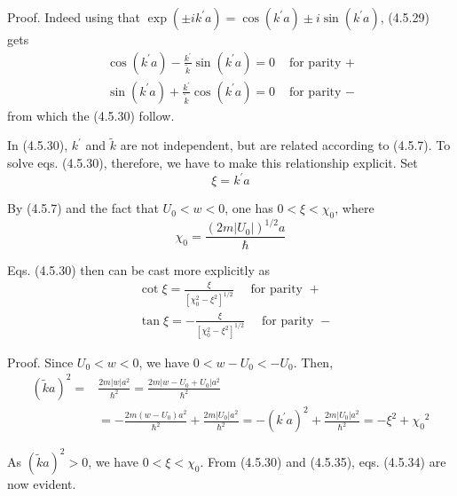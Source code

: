 \documentclass{article}
\begin{document}
Proof. Indeed using that $\exp \left( \pm i k^{\prime} a\right)=\cos \left(k^{\prime} a\right) \pm i \sin \left(k^{\prime} a\right)$, (4.5.29) gets
$$
\begin{array}{ll}
\cos \left(k^{\prime} a\right)-\frac{k^{\prime}}{\tilde{k}} \sin \left(k^{\prime} a\right)=0 & \text { for parity }+ \\
\sin \left(k^{\prime} a\right)+\frac{k^{\prime}}{\tilde{k}} \cos \left(k^{\prime} a\right)=0 & \text { for parity }- \tag{4.5.31b}
\end{array}
$$
from which the (4.5.30) follow.

In (4.5.30), $k^{\prime}$ and $\tilde{k}$ are not independent, but are related according to (4.5.7). To solve eqs. (4.5.30), therefore, we have to make this relationship explicit. Set
$$
\begin{equation*}
\xi=k^{\prime} a \tag{4.5.32}
\end{equation*}
$$

By (4.5.7) and the fact that $U_{0}<w<0$, one has $0<\xi<\chi_{0}$, where
$$
\begin{equation*}
\chi_{0}=\frac{\left(2 m\left|U_{0}\right|\right)^{1 / 2} a}{\hbar} \tag{4.5.33}
\end{equation*}
$$

Eqs. (4.5.30) then can be cast more explicitly as
$$
\begin{align*}
& \cot \xi=\frac{\xi}{\left[\chi_{0}^{2}-\xi^{2}\right]^{1 / 2}} \quad \text { for parity }+  \tag{4.5.34a}\\
& \tan \xi=-\frac{\xi}{\left[\chi_{0}^{2}-\xi^{2}\right]^{1 / 2}} \quad \text { for parity }- \tag{4.5.34b}
\end{align*}
$$

Proof. Since $U_{0}<w<0$, we have $0<w-U_{0}<-U_{0}$. Then,
$$
\begin{align*}
(\tilde{k} a)^{2}= & \frac{2 m|w| a^{2}}{\hbar^{2}}=\frac{2 m\left|w-U_{0}+U_{0}\right| a^{2}}{\hbar^{2}}  \tag{4.5.35}\\
& =-\frac{2 m\left(w-U_{0}\right) a^{2}}{\hbar^{2}}+\frac{2 m\left|U_{0}\right| a^{2}}{\hbar^{2}}=-\left(k^{\prime} a\right)^{2}+\frac{2 m\left|U_{0}\right| a^{2}}{\hbar^{2}}=-\xi^{2}+\chi_{0}{ }^{2}
\end{align*}
$$

As $(\tilde{k} a)^{2}>0$, we have $0<\xi<\chi_{0}$. From (4.5.30) and (4.5.35), eqs. (4.5.34) are now
evident.
\end{document}
